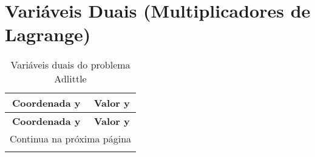 \documentclass[12pt]{article}
\begin{document}
\section{Variáveis Duais (Multiplicadores de Lagrange)}

\begin{longtable}{@{}cc@{}}
\caption{Variáveis duais do problema Adlittle} \\
\toprule
\textbf{Coordenada y} & \textbf{Valor y} \\
\midrule
\endfirsthead

\toprule
\textbf{Coordenada y} & \textbf{Valor y} \\
\midrule
\endhead

\midrule \multicolumn{2}{r}{{Continua na próxima página}} \\ \midrule
\endfoot


\end{longtable}
\end{document}

